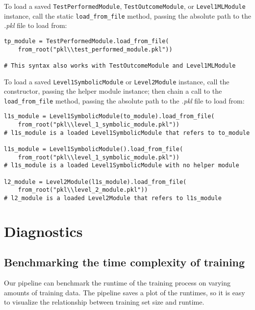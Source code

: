 \documentclass[a4paper]{article}
\begin{document}
To load a saved \lstinline{TestPerformedModule}, \lstinline{TestOutcomeModule}, or \lstinline{Level1MLModule} instance, call the static \lstinline{load_from_file} method, passing the absolute path to the \textit{.pkl} file to load from:

\lstset{language=Python}
\begin{lstlisting}
tp_module = TestPerformedModule.load_from_file(
    from_root("pkl\\test_performed_module.pkl"))

# This syntax also works with TestOutcomeModule and Level1MLModule
\end{lstlisting}
\lstset{language=}

To load a saved \lstinline{Level1SymbolicModule} or \lstinline{Level2Module} instance, call the constructor, passing the helper module instance; then chain a call to the \lstinline{load_from_file} method, passing the absolute path to the \textit{.pkl} file to load from:

\lstset{language=Python}
\begin{lstlisting}
l1s_module = Level1SymbolicModule(to_module).load_from_file(
    from_root("pkl\\level_1_symbolic_module.pkl"))
# l1s_module is a loaded Level1SymbolicModule that refers to to_module

l1s_module = Level1SymbolicModule().load_from_file(
    from_root("pkl\\level_1_symbolic_module.pkl"))
# l1s_module is a loaded Level1SymbolicModule with no helper module

l2_module = Level2Module(l1s_module).load_from_file(
    from_root("pkl\\level_2_module.pkl"))
# l2_module is a loaded Level2Module that refers to l1s_module
\end{lstlisting}
\lstset{language=}

\section{Diagnostics}

\subsection{Benchmarking the time complexity of training}

Our pipeline can benchmark the runtime of the training process on varying amounts of training data. The pipeline saves a plot of the runtimes, so it is easy to visualize the relationship between training set size and runtime.
\end{document}

